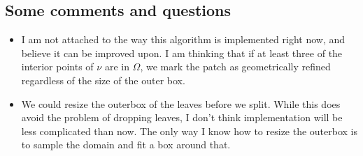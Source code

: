 \documentclass{article}
\begin{document}
\subsection{Some comments and questions}
\begin{itemize}
\item I am not attached to the way this algorithm is implemented right now, and believe it can be improved upon. I am thinking that if at least three of the interior points of $\nu$ are in $\Omega$, we mark the patch as geometrically refined regardless of the size of the outer box.
\item We could resize the outerbox of the leaves before we split. While this does avoid the problem of dropping leaves, I don't think implementation will be less complicated than now. The only way I know how to resize the outerbox is to sample the domain and fit a box around that.
\end{itemize}
\end{document}
